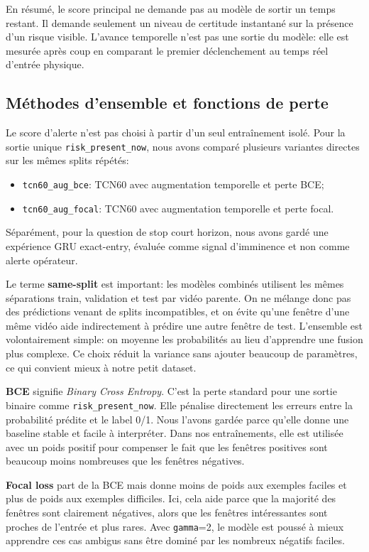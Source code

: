 \documentclass[11pt]{article}
\begin{document}
En résumé, le score principal ne demande pas au modèle de sortir un temps restant. Il demande seulement un niveau de certitude instantané sur la présence d'un risque visible. L'avance temporelle n'est pas une sortie du modèle: elle est mesurée après coup en comparant le premier déclenchement au temps réel d'entrée physique.

\subsection{Méthodes d'ensemble et fonctions de perte}
Le score d'alerte n'est pas choisi à partir d'un seul entraînement isolé. Pour la sortie unique \texttt{risk\_present\_now}, nous avons comparé plusieurs variantes directes sur les mêmes splits répétés:
\begin{itemize}[leftmargin=*]
\item \texttt{tcn60\_aug\_bce}: TCN60 avec augmentation temporelle et perte BCE;
\item \texttt{tcn60\_aug\_focal}: TCN60 avec augmentation temporelle et perte focal.
\end{itemize}
Séparément, pour la question de stop court horizon, nous avons gardé une expérience GRU exact-entry, évaluée comme signal d'imminence et non comme alerte opérateur.

Le terme \textbf{same-split} est important: les modèles combinés utilisent les mêmes séparations train, validation et test par vidéo parente. On ne mélange donc pas des prédictions venant de splits incompatibles, et on évite qu'une fenêtre d'une même vidéo aide indirectement à prédire une autre fenêtre de test. L'ensemble est volontairement simple: on moyenne les probabilités au lieu d'apprendre une fusion plus complexe. Ce choix réduit la variance sans ajouter beaucoup de paramètres, ce qui convient mieux à notre petit dataset.

\textbf{BCE} signifie \emph{Binary Cross Entropy}. C'est la perte standard pour une sortie binaire comme \texttt{risk\_present\_now}. Elle pénalise directement les erreurs entre la probabilité prédite et le label 0/1. Nous l'avons gardée parce qu'elle donne une baseline stable et facile à interpréter. Dans nos entraînements, elle est utilisée avec un poids positif pour compenser le fait que les fenêtres positives sont beaucoup moins nombreuses que les fenêtres négatives.

\textbf{Focal loss} part de la BCE mais donne moins de poids aux exemples faciles et plus de poids aux exemples difficiles. Ici, cela aide parce que la majorité des fenêtres sont clairement négatives, alors que les fenêtres intéressantes sont proches de l'entrée et plus rares. Avec \texttt{gamma}=2, le modèle est poussé à mieux apprendre ces cas ambigus sans être dominé par les nombreux négatifs faciles.
\end{document}
